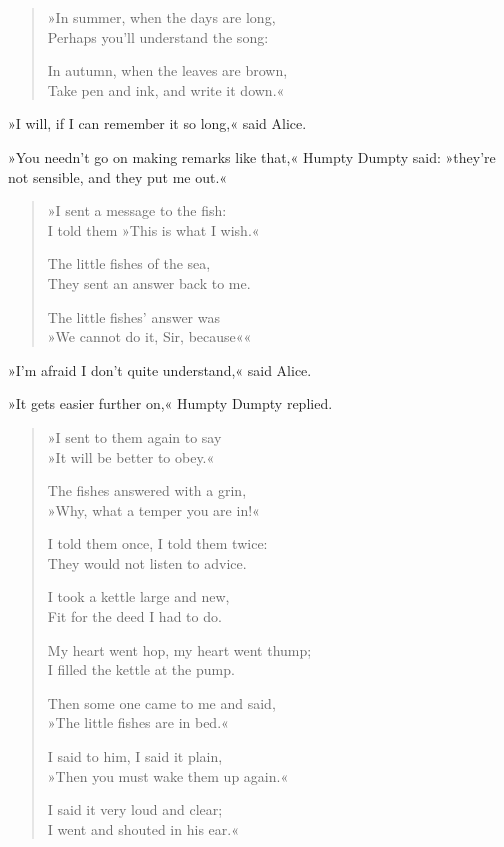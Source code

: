 \begin{verse}
»In summer, when the days are long,\\
\vin Perhaps you'll understand the song:

In autumn, when the leaves are brown,\\
\vin Take pen and ink, and write it down.«
\end{verse}

»I will, if I can remember it so long,« said Alice.

»You needn't go on making remarks like that,« Humpty Dumpty said: »they're not sensible, and they put me out.«

\begin{verse}
»I sent a message to the fish:\\
\vin I told them »This is what I wish.«

The little fishes of the sea,\\
\vin They sent an answer back to me.

The little fishes' answer was\\
\vin »We cannot do it, Sir, because\longdash««
\end{verse}

»I'm afraid I don't quite understand,« said Alice.

»It gets easier further on,« Humpty Dumpty replied.

\begin{verse}
»I sent to them again to say\\
\vin »It will be better to obey.«

The fishes answered with a grin,\\
\vin »Why, what a temper you are in!«

I told them once, I told them twice:\\
\vin They would not listen to advice.

I took a kettle large and new,\\
\vin Fit for the deed I had to do.

My heart went hop, my heart went thump;\\
\vin I filled the kettle at the pump.

Then some one came to me and said,\\
\vin »The little fishes are in bed.«

I said to him, I said it plain,\\
\vin »Then you must wake them up again.«

I said it very loud and clear;\\
\vin I went and shouted in his ear.«
\end{verse}

